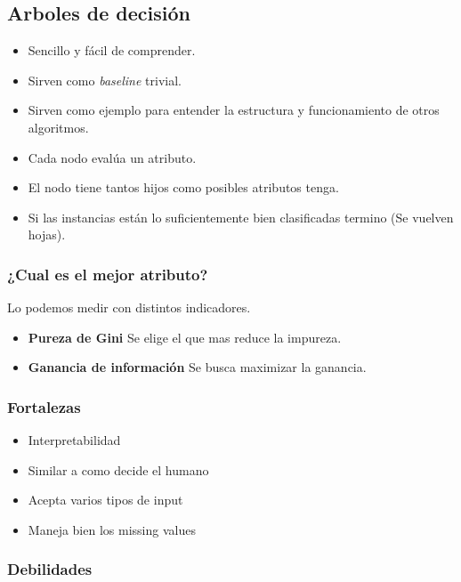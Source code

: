 \documentclass[titlepage,a4paper]{article}
\begin{document}
\subsection{Arboles de decisión}
\begin{itemize}
    \item Sencillo y fácil de comprender.
    \item Sirven como \textit{baseline} trivial.
    \item Sirven como ejemplo para entender la estructura y funcionamiento de otros algoritmos.
    \item Cada nodo evalúa un atributo.
    \item El nodo tiene tantos hijos como posibles atributos tenga.
    \item Si las instancias están lo suficientemente bien clasificadas termino (Se vuelven hojas).
\end{itemize}

\subsubsection*{¿Cual es el mejor atributo?}
Lo podemos medir con distintos indicadores.
\begin{itemize}
    \item \textbf{Pureza de Gini} Se elige el que mas reduce la impureza. %
    \item \textbf{Ganancia de información} Se busca maximizar la ganancia. %
\end{itemize}


\subsubsection*{Fortalezas}

\begin{itemize}
    \item Interpretabilidad
    \item Similar a como decide el humano
    \item Acepta varios tipos de input
    \item Maneja bien  los missing values
\end{itemize}

\subsubsection*{Debilidades}
\end{document}
